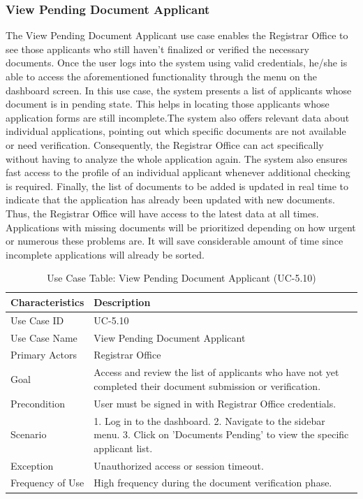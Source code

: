 \subsubsection{View Pending Document Applicant}
The View Pending Document Applicant use case enables the Registrar Office to see those applicants who still haven't finalized or verified the necessary documents. Once the user logs into the system using valid credentials, he/she is able to access the aforementioned functionality through the menu on the dashboard screen. In this use case, the system presents a list of applicants whose document is in pending state. This helps in locating those applicants whose application forms are still incomplete.The system also offers relevant data about individual applications, pointing out which specific documents are not available or need verification. Consequently, the Registrar Office can act specifically without having to analyze the whole application again. The system also ensures fast access to the profile of an individual applicant whenever additional checking is required. Finally, the list of documents to be added is updated in real time to indicate that the application has already been updated with new documents. Thus, the Registrar Office will have access to the latest data at all times. Applications with missing documents will be prioritized depending on how urgent or numerous these problems are. It will save considerable amount of time since incomplete applications will already be sorted.
\begin{table}[H]
    \centering
    \small
    \renewcommand{\arraystretch}{1.4}
    \caption{Use Case Table: View Pending Document Applicant (UC-5.10)} %
    \label{tab:view-pending-docs-registrar}
    \begin{tabularx}{\textwidth}{|l|X|}
        \hline 
        \rowcolor[gray]{0.9} {Characteristics} & {Description} \\ \hline
        Use Case ID & UC-5.10 \\ \hline
        Use Case Name & View Pending Document Applicant \\ \hline
        Primary Actors & Registrar Office \\ \hline
        Goal & Access and review the list of applicants who have not yet completed their document submission or verification. \\ \hline
        Precondition & User must be signed in with Registrar Office credentials. \\ \hline
        Scenario & 1. Log in to the dashboard. 2. Navigate to the sidebar menu. 3. Click on 'Documents Pending' to view the specific applicant list. \\ \hline
        Exception & Unauthorized access or session timeout. \\ \hline
        Frequency of Use & High frequency during the document verification phase. \\ \hline
    \end{tabularx}
\end{table}
\FloatBarrier